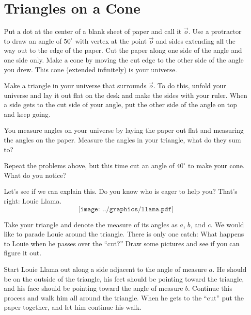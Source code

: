 \newpage
\section{Triangles on a Cone}	


\begin{prob}
Put a dot at the center of a blank sheet of paper and call it $\vec{o}$.
Use a protractor to draw an angle of $50^\circ$ with vertex at the
point $\vec{o}$ and sides extending all the way out to the edge of the
paper.  Cut the paper along one side of the angle and one side only.
Make a cone by moving the cut edge to the other side of the angle you
drew.  This cone (extended infinitely) is your universe.
\end{prob}


\begin{prob}
Make a triangle in your universe that surrounds $\vec{o}$. To do this,
unfold your universe and lay it out flat on the desk and make the
sides with your ruler.  When a side gets to the cut side of your
angle, put the other side of the angle on top and keep going.
\end{prob}

\begin{prob}
You measure angles on your universe by laying the paper out flat and
measuring the angles on the paper. Measure the angles in your
triangle, what do they sum to?
\end{prob}


\begin{prob}
Repeat the problems above, but this time cut an angle of $40^\circ$ to
make your cone. What do you notice?
\end{prob}

Let's see if we can explain this. Do you know who is eager to help
you? That's right: Louie Llama.
\[
\texttt{[image: ../graphics/llama.pdf]}
\]

\begin{prob}
Take your triangle and denote the measure of its angles as $a$, $b$,
and $c$. We would like to parade Louie around the triangle. There is
only one catch: What happens to Louie when he passes over the ``cut?''
Draw some pictures and see if you can figure it out.
\end{prob}

Start Louie Llama out along a side adjacent to the angle of measure
$a$. He should be on the outside of the triangle, his feet should be
pointing toward the triangle, and his face should be pointing toward
the angle of measure $b$. Continue this process and walk him all
around the triangle. When he gets to the ``cut'' put the paper
together, and let him continue his walk.

